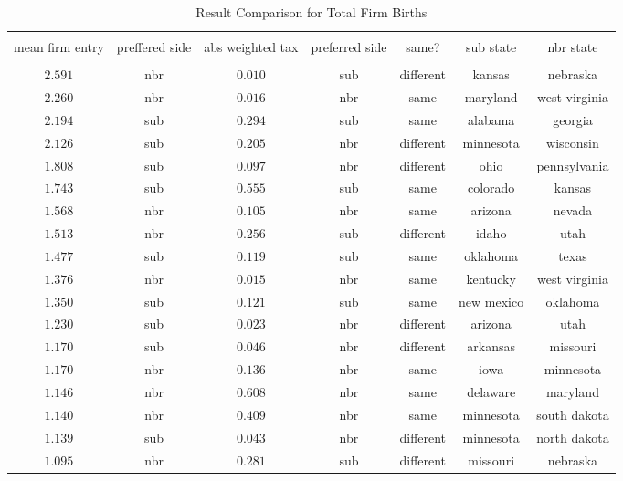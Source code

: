 
\begin{table}[!htbp] \centering 
  \caption{Result Comparison for Total Firm Births} 
  \label{taxdifferential} 
\tiny 
\begin{tabular}{@{\extracolsep{5pt}} ccccccc} 
\\[-1.8ex]\hline 
\hline \\[-1.8ex] 
mean firm entry & preffered side & abs weighted tax & preferred side & same? & sub state & nbr state \\ 
\hline \\[-1.8ex] 
$2.591$ & nbr & $0.010$ & sub & different & kansas & nebraska \\ 
$2.260$ & nbr & $0.016$ & nbr & same & maryland & west virginia \\ 
$2.194$ & sub & $0.294$ & sub & same & alabama & georgia \\ 
$2.126$ & sub & $0.205$ & nbr & different & minnesota & wisconsin \\ 
$1.808$ & sub & $0.097$ & nbr & different & ohio & pennsylvania \\ 
$1.743$ & sub & $0.555$ & sub & same & colorado & kansas \\ 
$1.568$ & nbr & $0.105$ & nbr & same & arizona & nevada \\ 
$1.513$ & nbr & $0.256$ & sub & different & idaho & utah \\ 
$1.477$ & sub & $0.119$ & sub & same & oklahoma & texas \\ 
$1.376$ & nbr & $0.015$ & nbr & same & kentucky & west virginia \\ 
$1.350$ & sub & $0.121$ & sub & same & new mexico & oklahoma \\ 
$1.230$ & sub & $0.023$ & nbr & different & arizona & utah \\ 
$1.170$ & sub & $0.046$ & nbr & different & arkansas & missouri \\ 
$1.170$ & nbr & $0.136$ & nbr & same & iowa & minnesota \\ 
$1.146$ & nbr & $0.608$ & nbr & same & delaware & maryland \\ 
$1.140$ & nbr & $0.409$ & nbr & same & minnesota & south dakota \\ 
$1.139$ & sub & $0.043$ & nbr & different & minnesota & north dakota \\ 
$1.095$ & nbr & $0.281$ & sub & different & missouri & nebraska \\ 

\end{tabular}
\end{table}
